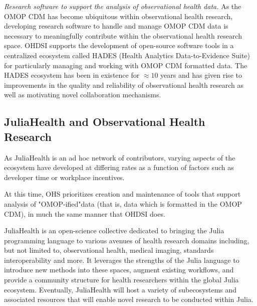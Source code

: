 \documentclass{juliacon}
\begin{document}
\textit{Research software to support the analysis of observational health data.} As the OMOP CDM has become ubiquitous within observational health research, developing research software to handle and manage OMOP CDM data is necessary to meaningfully contribute within the observational health research space.
OHDSI supports the development of open-source software tools in a centralized ecosystem called HADES (Health Analytics Data-to-Evidence Suite) for particularly managing and working with OMOP CDM formatted data.
The HADES ecosystem has been in existence for $\approx 10$ years and has given rise to improvements in the quality and reliability of observational health research as well as motivating novel collaboration mechanisms.

\subsection{JuliaHealth and Observational Health Research}

As JuliaHealth is an ad hoc network of contributors, varying aspects of the ecosystem have developed at differing rates as a function of factors such as developer time or workplace incentives.

At this time, OHS prioritizes creation and maintenance of tools that support analysis of "OMOP-ified"\footnotemark data (that is, data which is formatted in the OMOP CDM), in much the same manner that OHDSI does.


JuliaHealth is an open-science collective dedicated to bringing the Julia programming language to various avenues of health research domains including, but not limited to, observational health, medical imaging, standards interoperability and more.\cite{aluthgeAnnouncingJuliaHealthOrganization2020}
It leverages the strengths of the Julia language to introduce new methods into these spaces, augment existing workflows, and provide a community structure for health researchers within the global Julia ecosystem.
Eventually, JuliaHealth will host a variety of subecosystems and associated resources that will enable novel research to be conducted within Julia. 
\end{document}
